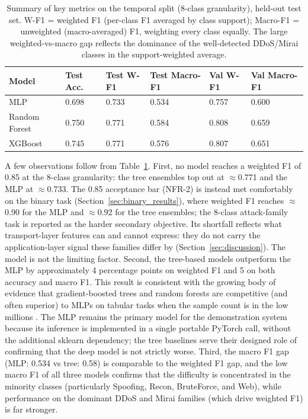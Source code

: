 \begin{table}[htbp]
\begin{center}
\begin{tabular}{|p{65pt}|p{50pt}|p{50pt}|p{50pt}|p{55pt}|p{55pt}|}
\hline
\textbf{Model} & \textbf{Test Acc.} & \textbf{Test W-F1} & \textbf{Test Macro-F1} & \textbf{Val W-F1} & \textbf{Val Macro-F1} \\
\hline
\hline MLP & 0.698 & 0.733 & 0.534 & 0.757 & 0.600 \\
\hline Random Forest & 0.750 & 0.771 & 0.584 & 0.808 & 0.659 \\
\hline XGBoost & 0.745 & 0.771 & 0.576 & 0.807 & 0.651 \\
\hline
\end{tabular}
\end{center}
\caption{Summary of key metrics on the temporal split (8-class granularity), held-out test set. W-F1 = weighted F1 (per-class F1 averaged by class support); Macro-F1 = unweighted (macro-averaged) F1, weighting every class equally. The large weighted-vs-macro gap reflects the dominance of the well-detected DDoS/Mirai classes in the support-weighted average.}
\label{tab:model_comparison_table}
\end{table}

\par A few observations follow from Table~\ref{tab:model_comparison_table}. First, no model reaches a weighted F1 of 0.85 at the 8-class granularity: the tree ensembles top out at $\approx$0.771 and the MLP at $\approx$0.733. The 0.85 acceptance bar (NFR-2) is instead met comfortably on the binary task (Section~\ref{sec:binary_results}), where weighted F1 reaches $\approx$0.90 for the MLP and $\approx$0.92 for the tree ensembles; the 8-class attack-family task is reported as the harder secondary objective. Its shortfall reflects what transport-layer features can and cannot express: they do not carry the application-layer signal these families differ by (Section~\ref{sec:discussion}). The model is not the limiting factor. Second, the tree-based models outperform the MLP by approximately 4 percentage points on weighted F1 and 5 on both accuracy and macro F1. This result is consistent with the growing body of evidence that gradient-boosted trees and random forests are competitive (and often superior) to MLPs on tabular tasks when the sample count is in the low millions \cite{Kadra2021}. The MLP remains the primary model for the demonstration system because its inference is implemented in a single portable PyTorch call, without the additional sklearn dependency; the tree baselines serve their designed role of confirming that the deep model is not strictly worse. Third, the macro F1 gap (MLP: 0.534 vs tree: 0.58) is comparable to the weighted F1 gap, and the low macro F1 of all three models confirms that the difficulty is concentrated in the minority classes (particularly Spoofing, Recon, BruteForce, and Web), while performance on the dominant DDoS and Mirai families (which drive weighted F1) is far stronger.


